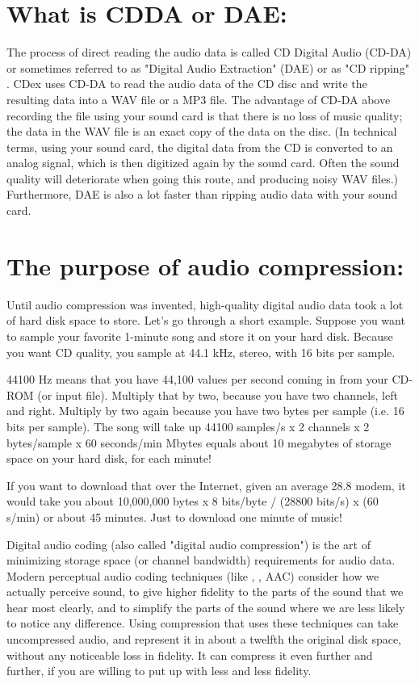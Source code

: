 \section{What is CDDA or DAE:}\label{cdda}
The process of direct reading the audio data is called CD Digital Audio (CD-DA)
or sometimes referred to as "Digital Audio Extraction" (DAE) or as
"CD ripping" . CDex uses CD-DA to read the audio data of the
CD disc and write the resulting data into a WAV file or a MP3 file. The
advantage of CD-DA above recording the file using your sound card is that
there is no loss of music quality; the data in the WAV file is an exact
copy of the data on the disc.  (In technical terms, using your sound card,
the digital data from the CD is converted to an analog signal, which is then
digitized again by the sound card. Often the sound quality will deteriorate when
going this route, and producing noisy WAV files.)  Furthermore, DAE is also a lot
faster than ripping audio data with your sound card.


\section{The purpose of audio compression:}
Until audio compression was invented, high-quality digital audio data took
a lot of hard disk space to store. Let's go through a short example. Suppose you
want to sample your favorite 1-minute song and store it on your
hard disk. Because you want CD quality, you sample at 44.1 kHz, stereo,
with 16 bits per sample.


44100 Hz means that you have 44,100 values per second coming in from your
CD-ROM (or input file). Multiply that by two, because you have two channels, left and right.
Multiply by two again because you have two bytes per sample (i.e. 16 bits
per sample). The song will take up 44100 samples/s x 2 channels x 2 bytes/sample x 60
seconds/min Mbytes equals about 10 megabytes of storage space on your hard disk,
for each minute!

If you want to download that over the Internet, given an average 28.8 modem,
it would take you about 10,000,000 bytes x 8 bits/byte / (28800 bits/s) x (60
s/min) or about 45 minutes. Just to download one minute of music!

Digital audio coding (also called "digital
audio compression") is the art of minimizing storage space (or channel
bandwidth) requirements for audio data.  Modern perceptual audio coding
techniques (like ,
, AAC) consider how we actually perceive
sound, to give higher fidelity to the parts of the sound that we hear
most clearly, and to simplify the parts of the sound where we are
less likely to notice any difference.  Using compression that uses
these techniques can take uncompressed audio, and represent it in
about a twelfth the original disk space, without any noticeable loss
in fidelity.  It can compress it even further and further, if you
are willing to put up with less and less fidelity.

